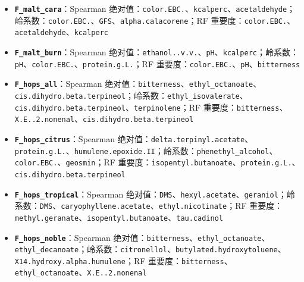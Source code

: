 \documentclass[
  11pt,
]{ctexart}
\newcounter{none} %
\begin{document}
\begin{itemize}
\item
  \textbf{\texttt{F\_malt\_cara}}：Spearman
  绝对值：\texttt{color.EBC.}、\texttt{kcalperc}、\texttt{acetaldehyde}；岭系数：\texttt{color.EBC.}、\texttt{GFS}、\texttt{alpha.\allowbreak{}calacorene}；RF
  重要度：\texttt{color.EBC.}、\texttt{acetaldehyde}、\texttt{kcalperc}
\item
  \textbf{\texttt{F\_malt\_burn}}：Spearman
  绝对值：\texttt{ethanol..v.v.}、\texttt{pH}、\texttt{kcalperc}；岭系数：\texttt{pH}、\texttt{color.EBC.}、\texttt{protein.g.L.}；RF
  重要度：\texttt{color.EBC.}、\texttt{pH}、\texttt{bitterness}
\item
  \textbf{\texttt{F\_hops\_all}}：Spearman
  绝对值：\texttt{bitterness}、\texttt{ethyl\_\allowbreak{}octanoate}、\texttt{cis.\allowbreak{}dihydro.\allowbreak{}beta.\allowbreak{}terpineol}；岭系数：\texttt{ethyl\_\allowbreak{}isovalerate}、\texttt{cis.\allowbreak{}dihydro.\allowbreak{}beta.\allowbreak{}terpineol}、\texttt{terpinolene}；RF
  重要度：\texttt{bitterness}、\texttt{X.\allowbreak{}E.\allowbreak{}.\allowbreak{}2.\allowbreak{}nonenal}、\texttt{cis.\allowbreak{}dihydro.\allowbreak{}beta.\allowbreak{}terpineol}
\item
  \textbf{\texttt{F\_\allowbreak{}hops\_\allowbreak{}citrus}}：Spearman
  绝对值：\texttt{delta.\allowbreak{}terpinyl.\allowbreak{}acetate}、\texttt{protein.g.L.}、\texttt{humulene.\allowbreak{}epoxide.\allowbreak{}II}；岭系数：\texttt{phenethyl\_\allowbreak{}alcohol}、\texttt{color.EBC.}、\texttt{geosmin}；RF
  重要度：\texttt{isopentyl.\allowbreak{}butanoate}、\texttt{protein.g.L.}、\texttt{cis.\allowbreak{}dihydro.\allowbreak{}beta.\allowbreak{}terpineol}
\item
  \textbf{\texttt{F\_\allowbreak{}hops\_\allowbreak{}tropical}}：Spearman
  绝对值：\texttt{DMS}、\texttt{hexyl.acetate}、\texttt{geraniol}；岭系数：\texttt{DMS}、\texttt{caryophyllene.\allowbreak{}acetate}、\texttt{ethyl.\allowbreak{}nicotinate}；RF
  重要度：\texttt{methyl.\allowbreak{}geranate}、\texttt{isopentyl.\allowbreak{}butanoate}、\texttt{tau.cadinol}
\item
  \textbf{\texttt{F\_\allowbreak{}hops\_\allowbreak{}noble}}：Spearman
  绝对值：\texttt{bitterness}、\texttt{ethyl\_\allowbreak{}octanoate}、\texttt{ethyl\_\allowbreak{}decanoate}；岭系数：\texttt{citronellol}、\texttt{butylated.\allowbreak{}hydroxytoluene}、\texttt{X14.\allowbreak{}hydroxy.\allowbreak{}alpha.\allowbreak{}humulene}；RF
  重要度：\texttt{bitterness}、\texttt{ethyl\_\allowbreak{}octanoate}、\texttt{X.\allowbreak{}E.\allowbreak{}.\allowbreak{}2.\allowbreak{}nonenal}

\end{itemize}
\end{document}

